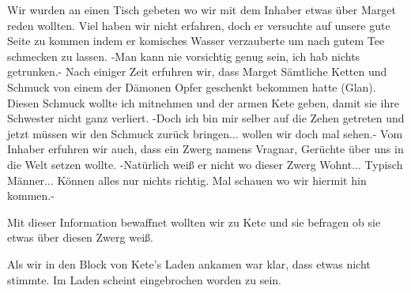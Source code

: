 \documentclass[10pt,twoside,openany]{book}
\begin{document}
	Wir wurden an einen Tisch gebeten wo wir mit dem Inhaber etwas über Marget reden wollten. Viel haben wir nicht erfahren, doch er versuchte auf unsere gute Seite zu kommen indem er komisches Wasser verzauberte um nach gutem Tee schmecken zu lassen. -Man kann nie vorsichtig genug sein, ich hab nichts getrunken.- Nach einiger Zeit erfuhren wir, dass Marget Sämtliche Ketten und Schmuck von einem der Dämonen Opfer geschenkt bekommen hatte (Glan). Diesen Schmuck wollte ich mitnehmen und der armen Kete geben, damit sie ihre Schwester nicht ganz verliert. -Doch ich bin mir selber auf die Zehen getreten und jetzt müssen wir den Schmuck zurück bringen... wollen wir doch mal sehen.- Vom Inhaber erfuhren wir auch, dass ein Zwerg namens Vragnar, Gerüchte über uns in die Welt setzen wollte. -Natürlich weiß er nicht wo dieser Zwerg Wohnt... Typisch Männer... Können alles nur nichts richtig. Mal schauen wo wir hiermit hin kommen.- 
	
	Mit dieser Information bewaffnet wollten wir zu Kete und sie befragen ob sie etwas über diesen Zwerg weiß. 
	
	Als wir in den Block von Kete's Laden ankamen war klar, dass etwas nicht stimmte. Im Laden scheint eingebrochen worden zu sein. 
	
\end{document}

